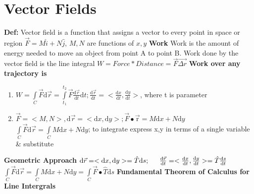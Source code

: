 \documentclass[twoside]{article}
\begin{document}
\section{Vector Fields}
\indent
\indent\textbf{Def:} Vector field is a function that assigns a vector to every point in space or region\newline
\indent\indent $\vec{F} = M\hat{i} + N\hat{j}$, $M,N$ are functions of $x,y$\newline
\indent
\textbf{Work} Work is the amount of energy needed to move an object from point A to point B.\newline
\indent\indent\indent Work done by the vector field is the line integral\newline
\indent\indent $W = Force * Distance = \vec{F}\vec{\Delta{r}}$\newline
\indent \textbf{Work over any trajectory is}\newline
\begin{enumerate}
\item
$W=\int\limits_C \vec{F}\mathrm{d}\vec{r}=\int\limits_{t_{1}}^{t_{2}}\vec{F}\frac{\mathrm{d}\vec{r}}{\mathrm{d}t}\mathrm{d}t; \frac{\mathrm{d}\vec{r}}{\mathrm{d}t} = <\frac{\mathrm{d}x}{\mathrm{d}t},\frac{\mathrm{d}y}{\mathrm{d}t}>$, where t is parameter
\item
$\vec{F} = <M,N>, \mathrm{d}\vec{r} = <\mathrm{d}x,\mathrm{d}y>; \vec{F} \bullet \mathrm{\vec{r}} = M\mathrm{d}x + N\mathrm{d}y$\newline\newline
$\int\limits_C \vec{F}\mathrm{d}\vec{r} = \int\limits_C M\mathrm{d}x + N\mathrm{d}y$; to integrate express x,y in terms of a single variable \& substitute
\end{enumerate}
\indent\indent
\textbf{Geometric Approach}\newline\newline
\indent\indent
$\mathrm{d}\vec{r} = <\mathrm{d}x,\mathrm{d}y> = \hat{T}\mathrm{d}s;\indent \frac{\mathrm{d}\vec{r}}{\mathrm{d}t} = <\frac{\mathrm{d}x}{\mathrm{d}t},\frac{\mathrm{d}y}{\mathrm{d}t}> = \hat{T}\frac{\mathrm{d}s}{\mathrm{d}t}$\newline\newline
\indent\indent
$\int\limits_C \vec{F}\mathrm{d}\vec{r} = \int\limits_C M\mathrm{d}x + N\mathrm{d}y = \int\limits_C \vec{F} \bullet \hat{T} \mathrm{d}s$\newline\newline
\indent
\textbf{Fundamental Theorem of Calculus for Line Intergrals}\newline\newline
\end{document}

